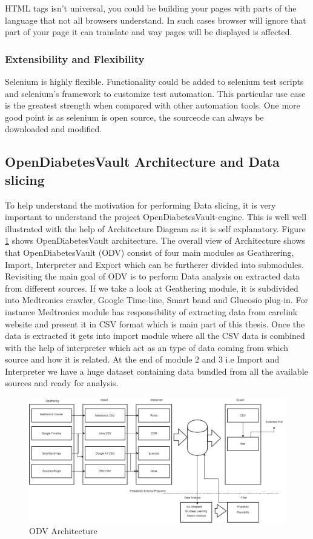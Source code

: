 \documentclass[article,type=msc,colorback,accentcolor=tud9c,twoside,11pt]{tudthesis}
\begin{document}
HTML tags isn't universal, you could be building your pages with parts of the language that not all browsers understand. In such cases browser will ignore that part of your page it can translate and way pages will be displayed is affected.

\subsubsection{Extensibility and Flexibility}
Selenium is highly flexible. Functionality could be added to selenium test scripts and selenium's framework to customize test automation. This particular use case is the greatest strength when compared with other automation tools. One more good point is as selenium is open source, the sourceode can always be downloaded and modified.

\subsection{OpenDiabetesVault Architecture and Data slicing}
\label{subsec:OpenDiabetesVaultArchitecture}
To help understand the motivation for performing Data slicing, it is very important to understand the project OpenDiabetesVault-engine. This is well well illustrated with the help of Architecture Diagram as it is self explanatory. Figure \ref{fig:ODVArchitecture} shows OpenDiabetesVault architecture. The overall view of Architecture shows that OpenDiabetesVault (ODV) consist of four main modules as Geathrering, Import, Interpreter and Export which can be furtherer divided into submodules. Revisiting the main goal of ODV is to perform Data analysis on extracted data from different sources. If we take a look at Geathering module, it is subdivided into Medtronics crawler, Google Time-line, Smart band and Glucosio plug-in. For instance Medtronics module has responsibility of extracting data from carelink website and present it in CSV format which is main part of this thesis. Once the data is extracted it gets into import module where all the CSV data is combined with the help of interpreter which act as an type of data coming from which source and how it is related. At the end of module 2 and 3 i.e Import and Interpreter we have a huge dataset containing data bundled from all the available sources and ready for analysis.
\begin{figure}[h]
	\centering
	\includegraphics[scale=0.4]{ODVArchitecture.jpg}
	\caption{ODV Architecture}
	\label{fig:ODVArchitecture}
\end{figure}
\end{document}
